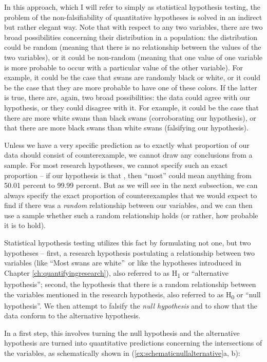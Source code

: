 In this approach, which I will refer to simply as statistical hypothesis testing, the problem of the non-falsifiability of quantitative hypotheses is solved in an indirect but rather elegant way. Note that with respect to any two variables, there are two broad possibilities concerning their distribution in a population: the distribution could be random (meaning that there is no relationship between the values of the two variables), or it could be non-random (meaning that one value of one variable is more probable to occur with a particular value of the other variable). For example, it could be the case that swans are randomly black or white, or it could be the case that they are more probable to have one of these colors. If the latter is true, there are, again, two broad possibilities: the data could agree with our hypothesis, or they could disagree with it. For example, it could be the case that there are more white swans than black swans (corroborating our hypothesis), or that there are more black swans than white swans (falsifying our hypothesis).

Unless we have a very specific prediction as to exactly what proportion of our data should consist of counterexample, we cannot draw any conclusions from a sample. For most research hypotheses, we cannot specify such an exact proportion -- if our hypothesis is that , then ``most'' could mean anything from 50.01 percent to 99.99 percent. But as we will see in the next subsection, we can always specify the exact proportion of counterexamples that we would expect to find if there was a \textit{random} relationship between our variables, and we can then use a sample whether such a random relationship holds (or rather, how probable it is to hold).

Statistical hypothesis testing utilizes this fact by formulating not one, but two hypotheses -- first, a research hypothesis postulating a relationship between two variables (like ``Most swans are white'' or like the hypotheses introduced in Chapter \ref{ch:quantifyingresearch}), also referred to as  H\textsubscript{1} or ``alternative hypothesis''; second, the hypothesis that there is a random relationship between the variables mentioned in the research hypothesis, also referred to as H\textsubscript{0} or ``null hypothesis''. We then attempt to falsify the \textit{null hypothesis} and to show that the data conform to the alternative hypothesis.

In a first step, this involves turning the null hypothesis and the alternative hypothesis are turned into quantitative predictions concerning the intersections of the variables, as schematically shown in (\ref{ex:schematicnullalternative}a, b):

